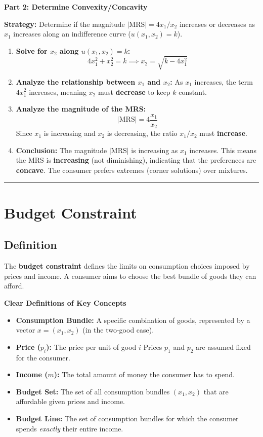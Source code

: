 \documentclass{article}
\begin{document}
\textbf{Part 2: Determine Convexity/Concavity}

\textbf{Strategy:} Determine if the magnitude $|\text{MRS}| = 4x_1/x_2$ increases or decreases as $x_1$ increases along an indifference curve ($u(x_1, x_2)=k$).

\begin{enumerate}
    \item \textbf{Solve for $x_2$ along $u(x_1, x_2) = k$:} $$ 4x_1^2 + x_2^2 = k \implies x_2 = \sqrt{k - 4x_1^2} $$
    \item \textbf{Analyze the relationship between $x_1$ and $x_2$:} As $x_1$ increases, the term $4x_1^2$ increases, meaning $x_2$ must \textbf{decrease} to keep $k$ constant.
    \item \textbf{Analyze the magnitude of the MRS:} $$ |\text{MRS}| = 4 \frac{x_1}{x_2} $$ Since $x_1$ is increasing and $x_2$ is decreasing, the ratio $x_1/x_2$ must \textbf{increase}.
    \item \textbf{Conclusion:} The magnitude $|\text{MRS}|$ is increasing as $x_1$ increases. This means the MRS is \textbf{increasing} (not diminishing), indicating that the preferences are \textbf{concave}. The consumer prefers extremes (corner solutions) over mixtures.
\end{enumerate}

\hrule
\pagebreak
\section{Budget Constraint}

\subsection{Definition}

The \textbf{budget constraint} defines the limits on consumption choices imposed by prices and income. A consumer aims to choose the best bundle of goods they can afford.

\textbf{Clear Definitions of Key Concepts}

\begin{itemize}
    \item \textbf{Consumption Bundle:} A specific combination of goods, represented by a vector $x = (x_1, x_2)$ (in the two-good case).
    \item \textbf{Price ($p_i$):} The price per unit of good $i$ Prices $p_1$ and $p_2$ are assumed fixed for the consumer.
    \item \textbf{Income ($m$):} The total amount of money the consumer has to spend.
    \item \textbf{Budget Set:} The set of all consumption bundles $(x_1, x_2)$ that are affordable given prices and income.
    \item \textbf{Budget Line:} The set of consumption bundles for which the consumer spends \textit{exactly} their entire income.
\end{itemize}
\end{document}
